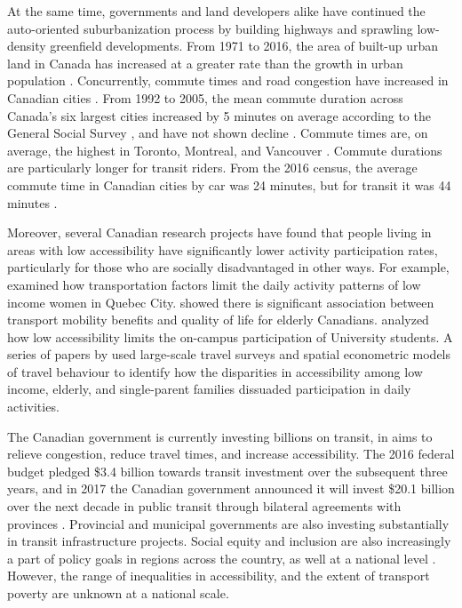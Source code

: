 \documentclass[11 pt, letterpaper]{article}
\begin{document}
{%

At the same time, governments and land developers alike have continued the auto-oriented suburbanization process by building highways and sprawling low-density greenfield developments. From 1971 to 2016, the area of built-up urban land in Canada has increased at a greater rate than the growth in urban population \cite{sc2016}. Concurrently, commute times and road congestion have increased in Canadian cities \cite{turcotte2005,metrolinx2008}. From 1992 to 2005, the mean commute duration across Canada's six largest cities increased by 5 minutes on average according to the General Social Survey \cite{turcotte2005}, and have not shown decline . Commute times are, on average, the highest in Toronto, Montreal, and Vancouver \cite{turcotte2011,higgins2017}. Commute durations are particularly longer for transit riders. From the 2016 census, the average commute time in Canadian cities by car was 24 minutes, but for transit it was 44 minutes \cite{sc2016}.

Moreover, several Canadian research projects have found that people living in areas with low accessibility have significantly lower activity participation rates, particularly for those who are socially disadvantaged in other ways. For example,  examined how transportation factors limit the daily activity patterns of low income women in Quebec City.  showed there is significant association between transport mobility benefits and quality of life for elderly Canadians.  analyzed how low accessibility limits the on-campus participation of University students. A series of papers by  used large-scale travel surveys and spatial econometric models of travel behaviour to identify how the disparities in accessibility among low income, elderly, and single-parent families dissuaded participation in daily activities.

The Canadian government is currently investing billions on transit, in aims to relieve congestion, reduce travel times, and increase accessibility. The 2016 federal budget pledged \$3.4 billion towards transit investment over the subsequent three years, and in 2017 the Canadian government announced it will invest \$20.1 billion over the next decade in public transit through bilateral agreements with provinces \cite{canbudget2017}. Provincial and municipal governments are also investing substantially in transit infrastructure projects. Social equity and inclusion are also increasingly a part of policy goals in regions across the country, as well at a national level \cite{canbudget2017}. However, the range of inequalities in accessibility, and the extent of transport poverty are unknown at a national scale.

}
\end{document}
